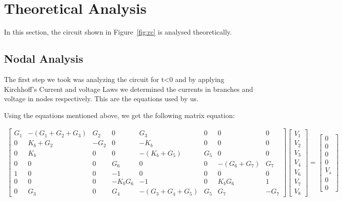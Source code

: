\section{Theoretical Analysis}
\label{sec:analysis}

In this section, the circuit shown in Figure~\ref{fig:rc} is analysed
theoretically.

\subsection{Nodal Analysis}

The first step we took was analyzing the circuit for t<0 and by applying Kirchhoff's Current and voltage Laws we determined the currents in branches and voltage in nodes respectively. This are the equations used by us.


Using the equations mentioned above, we get the following matrix equation:

\begin{gather}
	\begin{bmatrix}
		G_1 & -(G_1 + G_2 + G_3) & G_2 & 0 & G_3 & 0 & 0 & 0 \\ 
		0 & K_b + G_2 & -G_2 & 0 & -K_b & 0 & 0 & 0 \\
		0 & K_b & 0 & 0 & -(K_b + G_5) & G_5 & 0 & 0 \\ 
		0 & 0 & 0 & G_6 & 0 & 0 & -(G_6 + G_7) & G_7 \\
		1 & 0 & 0 & -1 & 0 & 0 & 0 & 0 \\
		0 & 0 & 0 & -K_bG_6 & -1 & 0 & K_bG_6 & 1 \\
		0 & G_3 & 0 & G_4 & -(G_3 + G_4 + G_5) & G_5 & G_7 & -G_7
	\end{bmatrix}
	\begin{bmatrix} V_1 \\ V_2 \\ V_3 \\ V_4 \\ V_6 \\ V_7 \\ V_8 \end{bmatrix}
	=
	\begin{bmatrix} 0 \\ 0 \\ 0 \\ 0 \\ V_s \\ 0 \\ 0 \end{bmatrix}
\end{gather}

